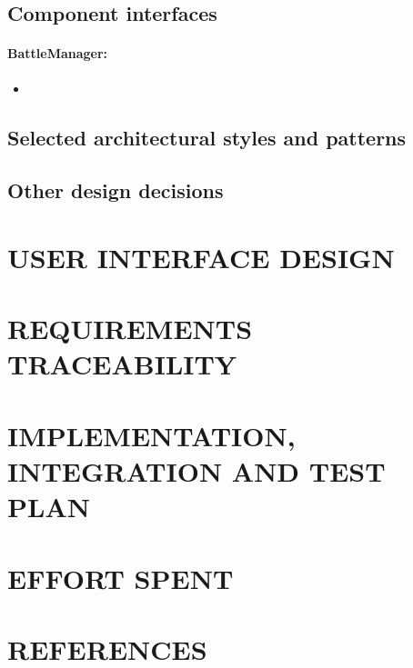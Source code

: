\documentclass{article}
\begin{document}
\subsection{Component interfaces}

\paragraph{BattleManager:}

\begin{itemize}
    \item 
\end{itemize}

\subsection{Selected architectural styles and patterns}
\subsection{Other design decisions}

\section{USER INTERFACE DESIGN}

\section{REQUIREMENTS TRACEABILITY}

\section{IMPLEMENTATION, INTEGRATION AND TEST PLAN}

\section{EFFORT SPENT}

\section{REFERENCES}
\end{document}

